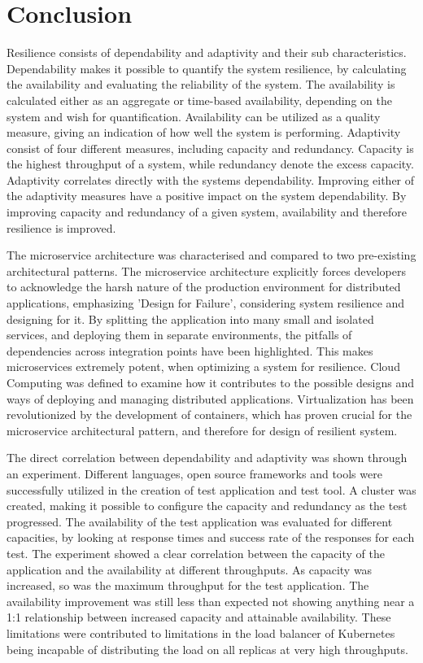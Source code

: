 \chapter{Conclusion}
\label{ch:conclusion}

Resilience consists of dependability and adaptivity and their sub characteristics. Dependability makes it possible to quantify the system resilience, by calculating the availability and evaluating the reliability of the system. The availability is calculated either as an aggregate or time-based availability, depending on the system and wish for quantification. Availability can be utilized as a quality measure, giving an indication of how well the system is performing. 
Adaptivity consist of four different measures, including capacity and redundancy. Capacity is the highest throughput of a system, while redundancy denote the excess capacity. Adaptivity correlates directly with the systems dependability. Improving either of the adaptivity measures have a positive impact on the system dependability. By improving capacity and redundancy of a given system, availability and therefore resilience is improved.

The microservice architecture was characterised and compared to two pre-existing architectural patterns. The microservice architecture explicitly forces developers to acknowledge the harsh nature of the production environment for distributed applications, emphasizing 'Design for Failure', considering system resilience and designing for it. By splitting the application into many small and isolated services, and deploying them in separate environments, the pitfalls of dependencies across integration points have been highlighted. This makes microservices extremely potent, when optimizing a system for resilience. Cloud Computing was defined to examine how it contributes to the possible designs and ways of deploying and managing distributed applications. Virtualization has been revolutionized by the development of containers, which has proven crucial for the microservice architectural pattern, and therefore for design of resilient system.

The direct correlation between dependability and adaptivity was shown through an experiment. Different languages, open source frameworks and tools were successfully utilized in the creation of test application and test tool. A cluster was created, making it possible to configure the capacity and redundancy as the test progressed. The availability of the test application was evaluated for different capacities, by looking at response times and success rate of the responses for each test. The experiment showed a clear correlation between the capacity of the application and the availability at different throughputs. As capacity was increased, so was the maximum throughput for the test application. The availability improvement was still less than expected not showing anything near a 1:1 relationship between increased capacity and attainable availability. These limitations were contributed to limitations in the load balancer of Kubernetes being incapable of distributing the load on all replicas at very high throughputs.



